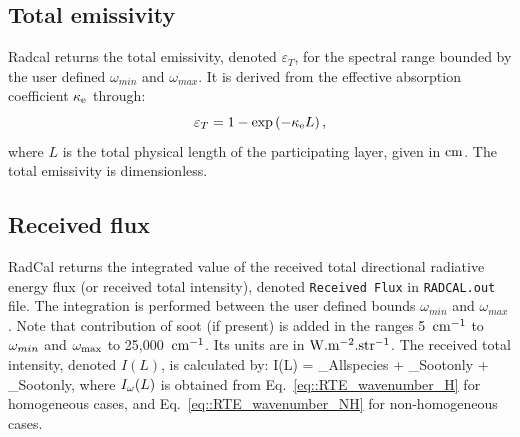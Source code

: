 \subsection{Total emissivity}

Radcal returns the total emissivity, denoted $\varepsilon_{T}$, for the spectral range bounded by the user defined $\omega_{min}$ and $\omega_{max}$. It is derived from the effective absorption coefficient $\kappa_{\rm e}$ through:
\begin{equation}\label{eq:total_emissivity}
\varepsilon_{T} = 1 - \exp\left(- \kappa_{\rm e} L \right),
\end{equation}
where $L$ is the total physical length of the participating layer, given in $\rm cm$. The total emissivity is dimensionless.

\subsection{Received flux}
RadCal returns the integrated value of the received total directional radiative energy flux (or received total intensity), denoted \verb=Received Flux= in \verb=RADCAL.out= file. The integration is performed between the user defined bounds $\omega_{min}$ and $\omega_{max}$. Note that contribution of soot (if present) is added in the ranges 5~$\rm cm^{-1}$ to $\omega_{min}$ and $\omega_{\max}$ to 25,000~$\rm cm^{-1}$. Its units are in $\rm W.m^{-2}.str^{-1}$. The received total intensity, denoted $I(L)$, is calculated by:
\be\label{eq::received_flux}
I(L) = _{\rm All\:species} + _{\rm Soot\:only} +  _{\rm Soot\:only},
\ee
where $I_{\omega}(L)$ is obtained from Eq.~\ref{eq::RTE_wavenumber_H} for homogeneous cases, and Eq.~\ref{eq::RTE_wavenumber_NH} for non-homogeneous cases.
